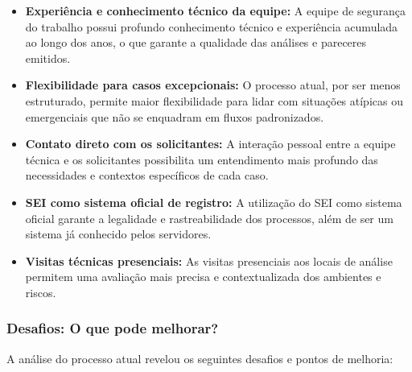 \documentclass[12pt,a4paper]{article}
\begin{document}
\begin{itemize}
    \item \textbf{Experiência e conhecimento técnico da equipe:} A equipe de segurança do trabalho possui profundo conhecimento técnico e experiência acumulada ao longo dos anos, o que garante a qualidade das análises e pareceres emitidos.
    
    \item \textbf{Flexibilidade para casos excepcionais:} O processo atual, por ser menos estruturado, permite maior flexibilidade para lidar com situações atípicas ou emergenciais que não se enquadram em fluxos padronizados.
    
    \item \textbf{Contato direto com os solicitantes:} A interação pessoal entre a equipe técnica e os solicitantes possibilita um entendimento mais profundo das necessidades e contextos específicos de cada caso.
    
    \item \textbf{SEI como sistema oficial de registro:} A utilização do SEI como sistema oficial garante a legalidade e rastreabilidade dos processos, além de ser um sistema já conhecido pelos servidores.
    
    \item \textbf{Visitas técnicas presenciais:} As visitas presenciais aos locais de análise permitem uma avaliação mais precisa e contextualizada dos ambientes e riscos.
\end{itemize}

\subsubsection{Desafios: O que pode melhorar?}
A análise do processo atual revelou os seguintes desafios e pontos de melhoria:
\end{document}
